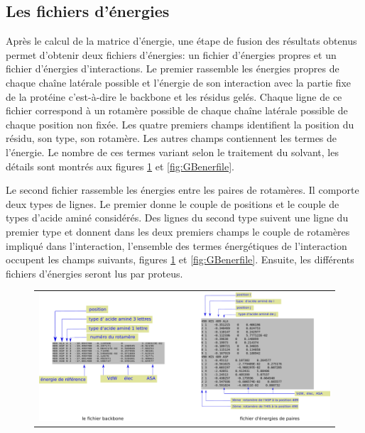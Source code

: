 \subsection{Les fichiers d'énergies}

Après le calcul de la matrice d'énergie, une étape de fusion des résultats obtenus permet d'obtenir deux fichiers d'énergies: un fichier d'énergies propres et un fichier d'énergies d'interactions. Le premier rassemble les énergies propres de chaque chaîne latérale possible et l'énergie de son interaction avec la partie fixe de la protéine c'est-à-dire le backbone et les résidus gelés. Chaque ligne de ce fichier correspond à un rotamère possible de chaque chaîne latérale possible de chaque position non fixée. Les quatre premiers champs identifient la position du résidu, son type, son rotamère. Les autres champs contiennent les termes de l'énergie. Le nombre de ces termes variant selon le traitement du solvant, les détails sont montrés aux figures \ref{fig:CAenerfile} et \ref{fig:GBenerfile}.   

Le second fichier rassemble les énergies entre les paires de rotamères. Il comporte deux types de lignes. Le premier donne le couple de positions et le couple de types d'acide aminé considérés. Des lignes du second type suivent une ligne du premier type et donnent dans les deux premiers champs le couple de rotamères impliqué dans l'interaction, l'ensemble des termes énergétiques de l'interaction occupent les champs suivants, figures \ref{fig:CAenerfile} et \ref{fig:GBenerfile}. Ensuite, les différents fichiers d'énergies seront lus par proteus. 

   \begin{figure}[!htbp]
     \centering
     \begin{tabular}{c}
       \includegraphics[width=16cm]{figure/inputener.png} 
     \end{tabular}     
     \caption{}
\label{fig:CAenerfile}
   \end{figure}


